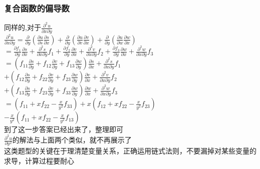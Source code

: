 \documentclass[xetex]{beamer}
\begin{document}
\begin{frame}
\frametitle{复合函数的偏导数}
	同样的,对于$\frac{\partial^2 u}{\partial x\partial y}$\\
		$\frac{\partial^2 u}{\partial x\partial y}=
	\frac{\partial }{\partial y}(\frac{\partial u}{\partial s}\frac{\partial s}{\partial x})+
	\frac{\partial }{\partial y}(\frac{\partial u}{\partial v}\frac{\partial v}{\partial x})+
	\frac{\partial }{\partial y}(\frac{\partial u}{\partial w}\frac{\partial w}{\partial x})$\\ \pause
	$=\frac{\partial f_1}{\partial y}\frac{\partial s}{\partial x}+\frac{\partial^2 s}{\partial x\partial y}f_1+
	\frac{\partial f_2}{\partial y}\frac{\partial v}{\partial x}+\frac{\partial^2 v}{\partial x\partial y}f_2+
	\frac{\partial f_3}{\partial y}\frac{\partial w}{\partial x}+\frac{\partial^2 w}{\partial x\partial y}f_3$\\ \pause
	$=(f_{11}\frac{\partial s}{\partial y}+f_{12}\frac{\partial v}{\partial y}+f_{13}\frac{\partial w}{\partial y})\frac{\partial s}{\partial x}+\frac{\partial^2 s}{\partial x\partial y}f_1$\\
	\quad$+(f_{12}\frac{\partial s}{\partial y}+f_{22}\frac{\partial v}{\partial y}+f_{23}\frac{\partial w}{\partial y})\frac{\partial v}{\partial x}+\frac{\partial^2 v}{\partial x\partial y}f_2$\\
	\quad$+(f_{13}\frac{\partial s}{\partial y}+f_{23}\frac{\partial v}{\partial y}+f_{33}\frac{\partial w}{\partial y})\frac{\partial w}{\partial x}+\frac{\partial^2 w}{\partial x\partial y}f_3$\\ \pause
	$=(f_{11}+xf_{22}-\frac{x}{y^2}f_{33})+x(f_{12}+xf_{22}-\frac{x}{y^2}f_{23})$\\
	\quad$-\frac{x}{y^2}(f_{11}+xf_{22}-\frac{x}{y^2}f_{13})$\\
	到了这一步\quad 答案已经出来了，整理即可\\
	$\frac{\partial^2 u}{\partial y^2}$的解法与上面两个类似，就不再展示了\\
	这类题型的关键在于理清楚变量关系，正确运用链式法则，不要漏掉对某些变量的求导，计算过程要耐心\\
\end{frame}
\end{document}
